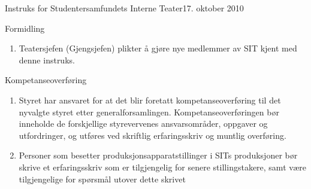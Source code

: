 \begin{instruks}{Instruks for Studentersamfundets Interne Teater}{17. oktober 2010}{ }
    \begin{instruksledd}{Formidling}
        \begin{enumerate}
            \item Teatersjefen (Gjengsjefen) plikter å gjøre nye medlemmer av SIT kjent med
                denne instruks.
        \end{enumerate}
    \end{instruksledd}

    \begin{instruksledd}{Kompetanseoverføring}
        \begin{enumerate}
            \item Styret har ansvaret for at det blir foretatt kompetanseoverføring til det
                nyvalgte styret etter generalforsamlingen. Kompetanseoverføringen bør inneholde de forskjellige
                styrevervenes ansvarsområder, oppgaver og utfordringer, og utføres ved skriftlig erfaringsskriv og
                muntlig overføring.
            \item Personer som besetter produksjonsapparatstillinger i SITs produksjoner bør
                skrive et erfaringsskriv som er tilgjengelig for senere stillingstakere, samt være tilgjengelige for
                spørsmål utover dette skrivet	
        \end{enumerate}
    \end{instruksledd}


\end{instruks}


